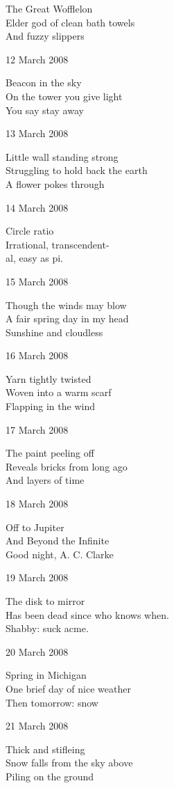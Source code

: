 \documentclass[12pt]{article}
\begin{document}
The Great Wofflelon \\
Elder god of clean bath towels \\
And fuzzy slippers

12 March 2008

Beacon in the sky \\
On the tower you give light \\
You say stay away

13 March 2008

Little wall standing strong \\
Struggling to hold back the earth \\
A flower pokes through

14 March 2008

Circle ratio \\
Irrational, transcendent- \\
al, easy as pi.

15 March 2008

Though the winds may blow \\
A fair spring day in my head \\
Sunshine and cloudless

16 March 2008

Yarn tightly twisted \\
Woven into a warm scarf \\
Flapping in the wind

17 March 2008

The paint peeling off \\
Reveals bricks from long ago \\
And layers of time

\newpage

18 March 2008

Off to Jupiter \\
And Beyond the Infinite \\
Good night, A. C. Clarke

19 March 2008

The disk to mirror \\
Has been dead since who knows when. \\
Shabby: suck acme.

20 March 2008

Spring in Michigan \\
One brief day of nice weather \\
Then tomorrow: snow

21 March 2008

Thick and stifleing \\
Snow falls from the sky above \\
Piling on the ground
\end{document}
